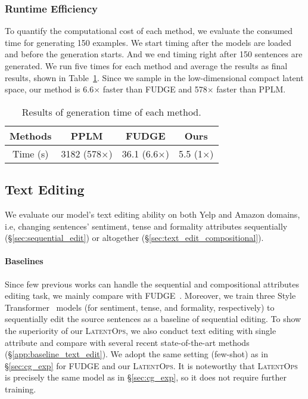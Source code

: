 \documentclass[11pt]{article}
\begin{document}
\subsubsection{Runtime Efficiency}
\label{sec:runtime}
To quantify the computational cost of each method, we evaluate the consumed time for generating 150 examples.
We start timing after the models are loaded and before the generation starts. And we end timing right after 150 sentences are generated. We run five times for each method and average the results as final results, shown in Table~\ref{tab:time_comsumed}. Since we sample in the low-dimensional compact latent space, our method is 6.6$\times$ faster than FUDGE and 578$\times$ faster than PPLM. 
\begin{table}[t]
\small
    \centering
    \vspace{-20pt}
    \begin{tabular}{cccc}
    \toprule
    Methods & PPLM & FUDGE & Ours \\\midrule
    Time (s) & 3182 (578$\times$) & 36.1 (6.6$\times$) & 5.5 (1$\times$)\\\bottomrule
    \end{tabular}
\caption{Results of generation time of each method.}
    \label{tab:time_comsumed}
    \vspace{-10pt}
\end{table}

\subsection{Text Editing}
\label{sec:tst_exp}
We evaluate our model's text editing ability on both Yelp and Amazon domains, i.e, changing sentences' sentiment, tense and formality attributes sequentially (\S\ref{sec:sequential_edit}) or altogether (\S\ref{sec:text_edit_compositional}). 

\paragraph{Baselines}
Since few previous works can handle the sequential and compositional attributes editing task, we mainly compare with  FUDGE~\cite{DBLP:journals/corr/abs-2104-05218}. 
Moreover, we train three Style Transformer~\cite{DBLP:conf/acl/DaiLQH19} models (for sentiment, tense, and formality, respectively) to sequentially edit the source sentences as a baseline of sequential editing. 
To show the superiority of our \textsc{LatentOps}, we also conduct text editing with single attribute and compare with several recent state-of-the-art methods (\S\ref{app:baseline_text_edit}).
We adopt the same setting (few-shot) as in \S\ref{sec:cg_exp} for FUDGE and our \textsc{LatentOps}.
It is noteworthy that \textsc{LatentOps} is precisely the same model as in \S\ref{sec:cg_exp}, so it does not require further training. 
\end{document}
